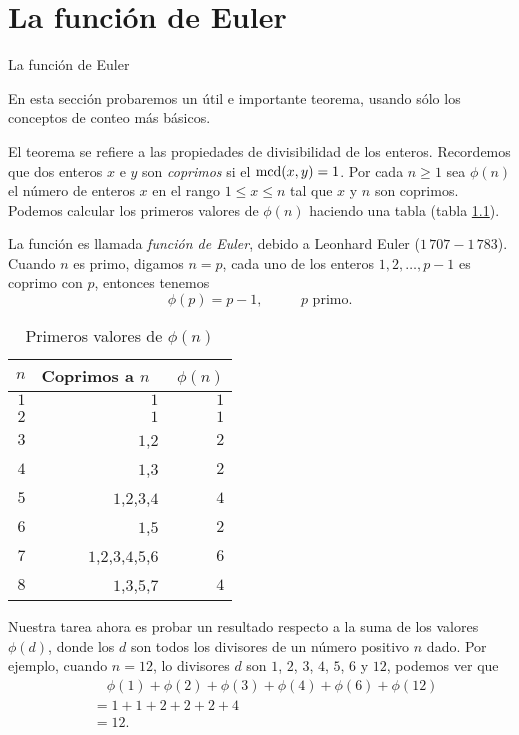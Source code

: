 
\appendix
\setcounter{chapter}{2}
\renewcommand{\thechapter}{\Alph{chapter}}
 \chapter[La función de Euler]{La función de Euler}

 \begin{section}{La función de Euler} \label{A2.1 }

 En esta sección probaremos un útil e importante teorema, usando sólo  los conceptos de conteo más básicos.

 El teorema se refiere a las  propiedades de divisibilidad de los enteros. Recordemos que dos enteros $x$ e
 $y$ son \textit{coprimos} si el $\operatorname{mcd}(x,y) = 1$. Por cada $n \ge 1$ sea  $\phi(n)$ el número de  enteros $x$ en el rango $1 \le x \le n$ tal que $x$ y $n$ son coprimos.  Podemos  calcular los primeros valores de $\phi(n)$ haciendo una tabla (tabla  \ref{tablaA2.1.1}).

La función es llamada \textit{función de Euler}, debido a Leonhard Euler   ($1\,707-1\,783$). Cuando $n$ es primo, digamos $n=p$, cada uno de los enteros $1,2,\ldots,p-1$ es coprimo con $p$, entonces tenemos 
$$
\phi(p)=p-1,\qquad\text{ $p$ primo.}
$$

\begin{table}[h]
\begin{center}
       \begin{tabular}{r|r|r}
              $n$&  Coprimos a $n$ \,&\,$\phi(n)$\\
             \hline
              $1$&$1$&$1$ \\
              $2$&$1$&$1$ \\
              $3$&$1$,$2$&$2$ \\
              $4$&$1$,$3$&$2$ \\
              $5$&$1$,$2$,$3$,$4$&$4$ \\
              $6$&$1$,$5$&$2$ \\
              $7$&$1$,$2$,$3$,$4$,$5$,$6$&$6$ \\
              $8$&$1$,$3$,$5$,$7$&$4$
       \end{tabular}
\end{center}
 \caption{Primeros valores de $\phi(n)$} \label{tablaA2.1.1}
\end{table}

Nuestra tarea ahora es probar un resultado respecto a la suma de los valores $\phi(d)$, donde los $d$ son todos los divisores de un número positivo $n$ dado. Por ejemplo, cuando $n=12$, lo divisores $d$ son $1$, $2$, $3$, $4$, $5$, $6$ y $12$, podemos ver que
\begin{align*}
&\quad\phi(1)+\phi(2)+\phi(3)+\phi(4)+\phi(6)+\phi(12)\\
&= 1 +1+2+2+2+4 \\
&=12.
\end{align*}


\end{section}
